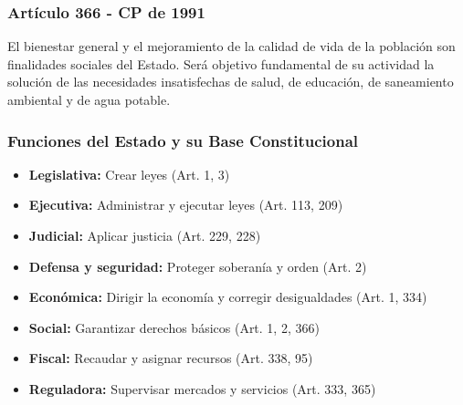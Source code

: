 \documentclass{beamer}
\begin{document}
\begin{frame}
  \frametitle{Art\'iculo 366 - CP de 1991}
  El bienestar general y el mejoramiento de la calidad de vida de la poblaci\'on son finalidades sociales del Estado. Ser\'a objetivo fundamental de su actividad la soluci\'on de las necesidades insatisfechas de salud, de educaci\'on, de saneamiento ambiental y de agua potable.
\end{frame}


\begin{frame}
  \frametitle{Funciones del Estado y su Base Constitucional}
  \begin{itemize}
    \item \textbf{Legislativa:} Crear leyes (Art. 1, 3)
    \item \textbf{Ejecutiva:} Administrar y ejecutar leyes (Art. 113, 209)
    \item \textbf{Judicial:} Aplicar justicia (Art. 229, 228)
    \item \textbf{Defensa y seguridad:} Proteger soberan\'ia y orden (Art. 2)
    \item \textbf{Econ\'omica:} Dirigir la econom\'ia y corregir desigualdades (Art. 1, 334)
    \item \textbf{Social:} Garantizar derechos b\'asicos (Art. 1, 2, 366)
    \item \textbf{Fiscal:} Recaudar y asignar recursos (Art. 338, 95)
    \item \textbf{Reguladora:} Supervisar mercados y servicios (Art. 333, 365)
  \end{itemize}
\end{frame}
\end{document}
